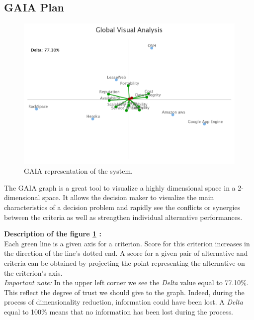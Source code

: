 \documentclass[a4paper,11pt]{article}
\begin{document}
\subsection{GAIA Plan}

\begin{figure}
\centering
  \includegraphics[width=\textwidth]{img/Result/gaia_plane.png}
\caption{GAIA representation of the system.}
  \label{fig:gaia}
\end{figure}

The GAIA graph is a great tool to visualize a highly dimensional space in a 2-dimensional space. It allows the decision maker to visualize the main characteristics of a decision problem and rapidly see the conflicts or synergies between the criteria as well as strengthen individual alternative performances.

\textbf{Description of the figure \ref{fig:gaia} :}\\

Each green line is a given axis for a criterion. Score for this criterion increases in the direction of the line's dotted end. A score for a given pair of alternative and criteria can be obtained by projecting the point representing the alternative on the criterion's axis. \\

\emph{Important note: } In the upper left corner we see the \textit{Delta} value equal to 77.10\%. This reflect the degree of trust we should give to the graph. Indeed, during the process of dimensionality reduction, information could have been lost. A \textit{Delta} equal to 100\% means that no information has been lost during the process.\\
\end{document}
